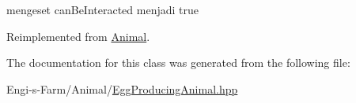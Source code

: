 mengeset can\+Be\+Interacted menjadi true 

Reimplemented from \mbox{\hyperlink{class_animal_a2810cff283192d06f93612364b8120f9}{Animal}}.



The documentation for this class was generated from the following file\+:\begin{DoxyCompactItemize}
\item 
Engi-\/s-\/\+Farm/\+Animal/\mbox{\hyperlink{_egg_producing_animal_8hpp}{Egg\+Producing\+Animal.\+hpp}}\end{DoxyCompactItemize}
